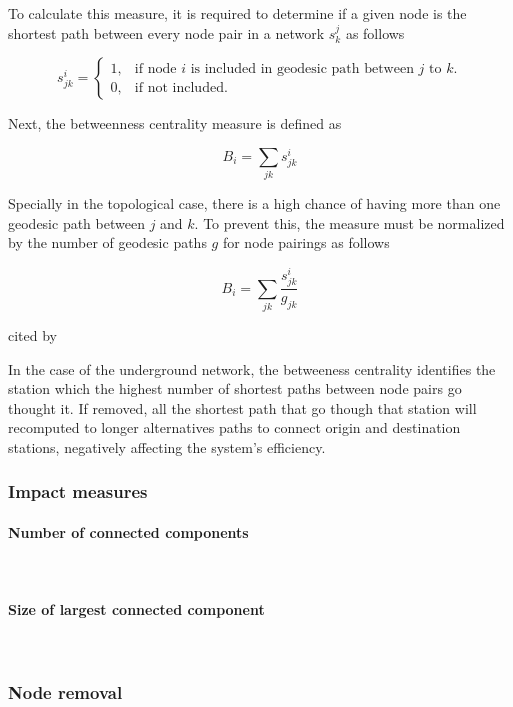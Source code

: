 \documentclass{article}
\begin{document}
To calculate this measure, it is required to determine if a given node is the shortest path between every node pair in a network $s^{j}_{k}$ as follows


\[s^{i}_{jk}=\begin{cases}
1, & \text{if node $i$ is included in geodesic path between $j$ to $k$}.\\
0, & \text{if not included}.
  \end{cases}
\]

Next, the betweenness centrality measure is defined as 

\[B_{i}=\sum_{jk} s^{i}_{jk}\]

Specially in the topological case, there is a high chance of having more than one geodesic path between $j$ and $k$. To prevent this, the measure must be normalized by the number of geodesic paths $g$ for node pairings as follows

\[B_{i}=\sum_{jk} \frac {s^{i}_{jk}}{g_{jk}}\]



\citep{newmanNetworks2018} cited by \citep{marinReviewCentralityMeasures2022}

In the case of the underground network, the betweeness centrality identifies the station which the highest number of shortest paths between node pairs go thought it. If removed, all the shortest path that go though that station will recomputed to longer alternatives paths to connect origin and destination stations, negatively affecting the system's efficiency.


\subsubsection{Impact measures}

\paragraph{Number of connected components}\mbox{}\\

\paragraph{Size of largest connected component}\mbox{}\\

\subsubsection{Node removal}
\end{document}
